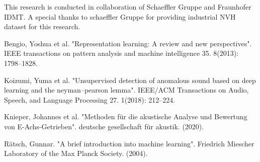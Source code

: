 \documentclass[conference]{IEEEtran}
\begin{document}
This research is conducted in collaboration of Schaeffler Gruppe and Fraunhofer IDMT. A special thanks to schaeffler Gruppe for providing industrial NVH dataset for this research.   


\begin{thebibliography}{00}
Bengio, Yoshua et al. "Representation learning: A review and new perspectives". IEEE transactions on pattern analysis and machine intelligence 35. 8(2013): 1798–1828.


Koizumi, Yuma et al. "Unsupervised detection of anomalous sound based on deep learning and the neyman–pearson lemma". IEEE/ACM Transactions on Audio, Speech, and Language Processing 27. 1(2018): 212–224.


Knieper, Johannes et al. "Methoden für die akustische Analyse und Bewertung von E-Achs-Getrieben". deutsche gesellschaft für akustik. (2020).


Rätsch, Gunnar. "A brief introduction into machine learning". Friedrich Miescher Laboratory of the Max Planck Society. (2004).


\end{thebibliography}
\end{document}

